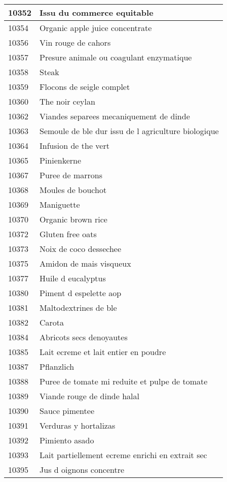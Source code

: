 \begin{longtable}{|l|l|}
10352 & Issu du commerce equitable \\ \hline 
10354 & Organic apple juice concentrate \\ \hline 
10356 & Vin rouge de cahors \\ \hline 
10357 & Presure animale ou coagulant enzymatique \\ \hline 
10358 & Steak \\ \hline 
10359 & Flocons de seigle complet \\ \hline 
10360 & The noir ceylan \\ \hline 
10362 & Viandes separees mecaniquement de dinde \\ \hline 
10363 & Semoule de ble dur issu de l agriculture biologique \\ \hline 
10364 & Infusion de the vert \\ \hline 
10365 & Pinienkerne \\ \hline 
10367 & Puree de marrons \\ \hline 
10368 & Moules de bouchot \\ \hline 
10369 & Maniguette \\ \hline 
10370 & Organic brown rice \\ \hline 
10372 & Gluten free oats \\ \hline 
10373 & Noix de coco dessechee \\ \hline 
10375 & Amidon de mais visqueux \\ \hline 
10377 & Huile d eucalyptus \\ \hline 
10380 & Piment d espelette aop \\ \hline 
10381 & Maltodextrines de ble \\ \hline 
10382 & Carota \\ \hline 
10384 & Abricots secs denoyautes \\ \hline 
10385 & Lait ecreme et lait entier en poudre \\ \hline 
10387 & Pflanzlich \\ \hline 
10388 & Puree de tomate mi reduite et pulpe de tomate \\ \hline 
10389 & Viande rouge de dinde halal \\ \hline 
10390 & Sauce pimentee \\ \hline 
10391 & Verduras y hortalizas \\ \hline 
10392 & Pimiento asado \\ \hline 
10393 & Lait partiellement ecreme enrichi en extrait sec \\ \hline 
10395 & Jus d oignons concentre \\ \hline 

\end{longtable}
